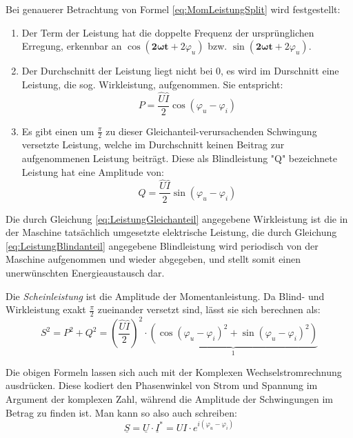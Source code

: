 Bei genauerer Betrachtung von Formel \eqref{eq:MomLeistungSplit} wird festgestellt:
\begin{enumerate}
\item Der Term der Leistung hat die doppelte Frequenz der ursprünglichen Erregung, erkennbar an $\cos(\mathbf{2\omega t} + 2\varphi_u)$ bzw. $\sin(\mathbf{2\omega t} + 2\varphi_u)$.

\item Der Durchschnitt der Leistung liegt nicht bei 0, es wird im Durschnitt eine Leistung, die sog. Wirkleistung, aufgenommen. Sie entspricht:
\begin{equation}
P = \frac{\hat{U}\hat{I}}{2}\cos(\varphi_u-\varphi_i) \label{eq:LeistungGleichanteil}
\end{equation}

\item Es gibt einen um $\frac{\pi}{2}$ zu dieser Gleichanteil-verursachenden Schwingung versetzte Leistung, welche im Durchschnitt keinen Beitrag zur aufgenommenen Leistung beiträgt. Diese als Blindleistung "Q" bezeichnete Leistung hat eine Amplitude von:
\begin{equation}
Q = \frac{\hat{U}\hat{I}}{2}\sin(\varphi_u - \varphi_i) \label{eq:LeistungBlindanteil}
\end{equation}
\end{enumerate}

Die durch Gleichung \eqref{eq:LeistungGleichanteil} angegebene Wirkleistung ist die in der Maschine tatsächlich umgesetzte elektrische Leistung, die durch Gleichung \eqref{eq:LeistungBlindanteil} angegebene Blindleistung wird periodisch von der Maschine aufgenommen und wieder abgegeben, und stellt somit einen unerwünschten Energieaustausch dar.

Die \textit{Scheinleistung} ist die Amplitude der Momentanleistung. Da Blind- und Wirkleistung exakt $\frac{\pi}{2}$ zueinander versetzt sind, lässt sie sich berechnen als:
\begin{equation}
S^2=P^2 + Q^2 = \left(\frac{\hat{U}\hat{I}}{2}\right)^2\cdot \underbrace{(\cos(\varphi_u - \varphi_i)^2 + \sin(\varphi_u - \varphi_i)^2)}_{1}
\end{equation}

Die obigen Formeln lassen sich auch mit der Komplexen Wechselstromrechnung ausdrücken. Diese kodiert den Phasenwinkel von Strom und Spannung im Argument der komplexen Zahl, während die Amplitude der Schwingungen im Betrag zu finden ist. Man kann so also auch schreiben:
\begin{equation}
\underline{S} = \underline{U}\cdot\underline{I}^* = UI\cdot e^{i(\varphi_u-\varphi_i)}
\end{equation}

